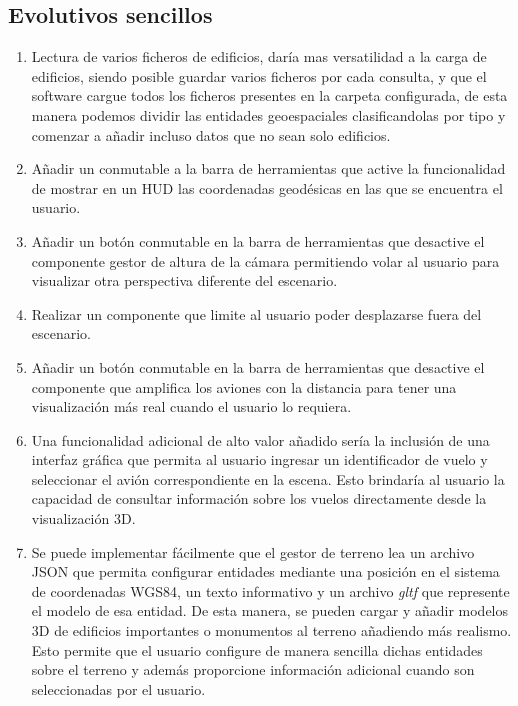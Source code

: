 \documentclass[a4paper, 11pt]{book}
\begin{document}
\subsection{Evolutivos sencillos}
\begin{enumerate}
	\item Lectura de varios ficheros de edificios, daría mas versatilidad a la carga de edificios, siendo posible guardar varios ficheros por cada consulta, y que el software cargue todos los ficheros presentes en la carpeta configurada, de esta manera podemos dividir las entidades geoespaciales clasificandolas por tipo y comenzar a añadir incluso datos que no sean solo edificios.
	\item Añadir un conmutable a la barra de herramientas que active la funcionalidad de mostrar en un \textsc{HUD} las coordenadas geodésicas en las que se encuentra el usuario.
	\item Añadir un botón conmutable en la barra de herramientas que desactive el componente gestor de altura de la cámara permitiendo volar al usuario para visualizar otra perspectiva diferente del escenario.
	\item Realizar un componente que limite al usuario poder desplazarse fuera del escenario.
	\item Añadir un botón conmutable en la barra de herramientas que desactive el componente que amplifica los aviones con la distancia para tener una visualización más real cuando el usuario lo requiera.
	\item Una funcionalidad adicional de alto valor añadido sería la inclusión de una interfaz gráfica que permita al usuario ingresar un identificador de vuelo y seleccionar el avión correspondiente en la escena. Esto brindaría al usuario la capacidad de consultar información sobre los vuelos directamente desde la visualización 3D.
	\item Se puede implementar fácilmente que el gestor de terreno lea un archivo \textsc{JSON} que permita configurar entidades mediante una posición en el sistema de coordenadas \textsc{WGS84}, un texto informativo y un archivo \emph{gltf} que represente el modelo de esa entidad. De esta manera, se pueden cargar y añadir modelos \textsc{3D} de edificios importantes o monumentos al terreno añadiendo más realismo. Esto permite que el usuario configure de manera sencilla dichas entidades sobre el terreno y además proporcione información adicional cuando son seleccionadas por el usuario.
\end{enumerate}
\end{document}
